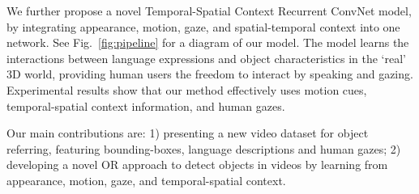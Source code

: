 \documentclass[10pt,twocolumn,letterpaper]{article}
\begin{document}
We further propose a novel Temporal-Spatial Context Recurrent ConvNet
model, by integrating appearance, motion, gaze, and spatial-temporal
context into one network. See Fig.~\ref{fig:pipeline} for a diagram of
our model. The model learns the interactions between language
expressions and object characteristics in the `real' 3D world,
providing human users the freedom to interact by speaking and gazing.
Experimental results show that our method effectively uses motion
cues, temporal-spatial context information, and human gazes.

Our main contributions are: 1) presenting a new video dataset for
object referring, featuring bounding-boxes, language descriptions and
human gazes; 2) developing a novel OR approach to detect objects in
videos by learning from appearance, motion, gaze, and temporal-spatial
context.
\end{document}
